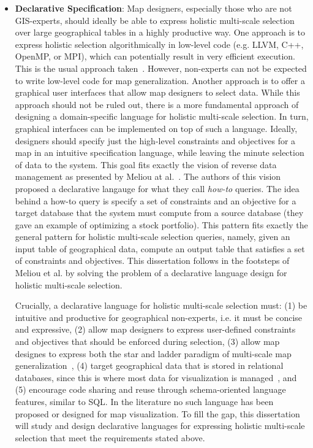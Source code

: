 \documentclass[11pt, oneside]{report}
\begin{document}
{\begin{itemize}
\item \textbf{Declarative Specification}: Map designers, especially those who are not GIS-experts, should ideally be able to express holistic multi-scale selection over large geographical tables in a highly productive way. One approach is to express holistic selection algorithmically in low-level code (e.g. LLVM, C++, OpenMP, or MPI), which can potentially result in very efficient execution. This is the usual approach taken~\cite{sarma2012fusiontables}. However, non-experts can not be expected to write low-level code for map generalization. Another approach is to offer a graphical user interfaces that allow map designers to select data. While this approach should not be ruled out, there is a more fundamental approach of designing a domain-specific language for holistic multi-scale selection. In turn, graphical interfaces can be implemented on top of such a language. Ideally, designers should specify just the high-level constraints and objectives for a map in an intuitive specification language, while leaving the minute selection of data to the system. This goal fits exactly the vision of reverse data management as presented by Meliou at al.~\cite{meliou2011reverse}. The authors of this vision proposed a declarative langauge for what they call \emph{how-to} queries. The idea behind a how-to query is specify a set of constraints and an objective for a target database that the system must compute from a source database (they gave an example of optimizing a stock portfolio). This pattern fits exactly the general pattern for holistic multi-scale selection queries, namely, given an input table of geographical data, compute an output table that satisfies a set of constraints and objectives. This dissertation follows in the footsteps of Meliou et al. by solving the problem of a declarative language design for holistic multi-scale selection.

Crucially, a declarative language for holistic multi-scale selection must: (1) be intuitive and productive for geographical non-experts, i.e. it must be concise and expressive, (2) allow map designers to express user-defined constraints and objectives that should be enforced during selection, (3) allow map designes to express both the star and ladder paradigm of multi-scale map generalization~\cite{foerster2010challenges},  (4) target geographical data that is stored in relational databases, since this is where most data for visualization is managed~\cite{wu2014case}, and (5) encourage code sharing and reuse through schema-oriented language features, similar to SQL. In the literature no such language has been proposed or designed for map visualization. To fill the gap, this dissertation will study and design declarative languages for expressing holistic multi-scale selection that meet the requirements stated above.


\end{itemize}}
\end{document}
